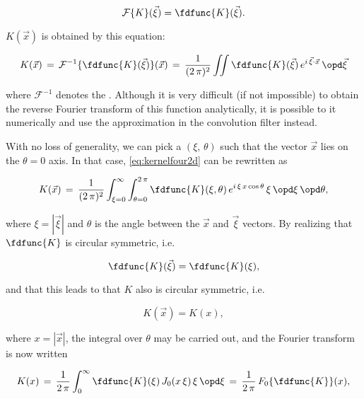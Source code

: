 \begin{equation}
\mathcal{F}\{K\}(\vec{\xi}) = \fdfunc{K}(\vec{\xi}).
\end{equation}

$K(\vec{x})$ is obtained by  this equation:

\begin{equation} \label{eq:kernelfour2d}
K(\vec{x})\, = \,\mathcal{F}^{-1}\{\fdfunc{K}(\vec{\xi})\}(\vec{x})\, = \,\frac{1}{(2\,\pi)^2}\iint\fdfunc{K}(\vec{\xi})\,e^{i\,\vec{\xi}\cdot\vec{x}}\,\opd\vec{\xi}
\end{equation}

where $\mathcal{F}^{-1}$ denotes the . Although it is very difficult (if not impossible) to obtain the reverse Fourier transform of this function analytically, it is possible to  it numerically and use the approximation in the convolution filter instead.

With no loss of generality, we can pick a  $(\xi,\,\theta)$ such that the vector $\vec{x}$ lies on the $\theta = 0$ axis. In that case, \eqref{eq:kernelfour2d} can be rewritten as

\begin{equation}
K(\vec{x})\, = \,\frac{1}{(2\,\pi)^2}\int_{\xi=0}^\infty\int_{\theta=0}^{2\,\pi}\fdfunc{K}(\xi, \theta)\,e^{i\,\xi\,x\cos\theta}\,\xi\,\opd\xi\,\opd\theta,
\end{equation}

where $\xi = |\vec{\xi}|$ and $\theta$ is the angle between the $\vec{x}$ and $\vec{\xi}$ vectors. By realizing that $\fdfunc{K}$ is circular symmetric, i.e.

\begin{equation}
\fdfunc{K}(\vec{\xi}) = \fdfunc{K}(\xi),
\end{equation}

and that this leads to that $K$ also is circular symmetric, i.e.

\begin{equation}
K(\vec{x}) = K(x),
\end{equation}

where $x = |\vec{x}|$, the integral over $\theta$ may be carried out, and the Fourier transform is now written

\begin{equation} \label{eq:fdkerneltokernel}
K(x)\, = \,\frac{1}{2\,\pi}\int_0^\infty\fdfunc{K}(\xi)\,J_0(x\,\xi)\,\xi\,\opd\xi\, = \,\frac{1}{2\,\pi}\,F_0\{\fdfunc{K}\}(x),
\end{equation}

